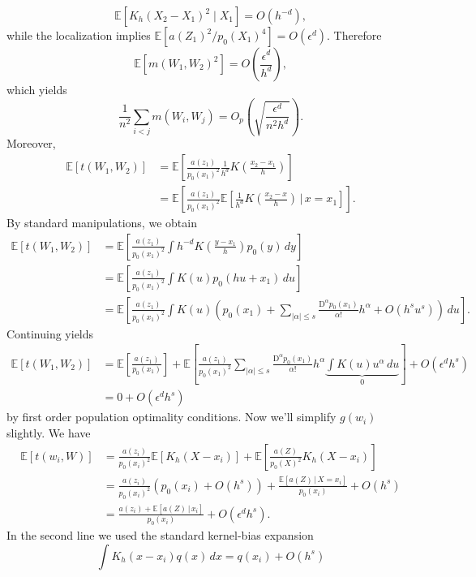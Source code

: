 \documentclass[11pt]{article}
\begin{document}
\[
\mathbb{E}[K_h(X_2-X_1)^2\mid X_1] = O(h^{-d}),
\]
while the localization implies $\mathbb{E}[a(Z_1)^2/p_0(X_1)^4] = O(\epsilon^d)$. Therefore
\[
\mathbb{E}[m(W_1,W_2)^2] = O\left(\frac{\epsilon^d}{h^d}\right),
\]
which yields
\[
\frac{1}{n^2}\sum_{i<j}m(W_i,W_j)
= O_p\left(\sqrt{\frac{\epsilon^d}{n^2h^d}}\right).
\]
Moreover,
\begin{align*}
    \mathbb{E}[t(W_1, W_2)] &= \mathbb{E}\left[\frac{a(z_1)}{p_0(x_1)^2}\frac{1}{h^d}K\left(\frac{x_2 - x_1}{h}\right)\right] \\
    &= \mathbb{E}\left[\frac{a(z_1)}{p_0(x_1)^2}\mathbb{E}\left[\frac{1}{h^d}K\left(\frac{x_2 - x}{h}\right)\,\Bigg|\, x = x_1\right]\right].
\end{align*}
By standard manipulations, we obtain 
\begin{align*}
    \mathbb{E}[t(W_1, W_2)] &= \mathbb{E}\left[\frac{a(z_1)}{p_0(x_1)^2}\int h^{-d}K\left(\frac{y - x_1}{h}\right)p_0(y) \,dy\right] \\
    &= \mathbb{E}\left[\frac{a(z_1)}{p_0(x_1)^2}\int K\left(u\right)p_0(hu + x_1) \,du\right] \tag{$u = (y-x_1)/h$} \\
    &= \mathbb{E}\left[\frac{a(z_1)}{p_0(x_1)^2}\int K\left(u\right)\left(p_0(x_1) + \sum_{|\alpha| \leq s}\frac{\text{D}^\alpha p_0(x_1)}{\alpha!}h^\alpha + O(h^su^s)\right) \,du\right].
\end{align*}
Continuing yields
\begin{align*}
    \mathbb{E}[t(W_1, W_2)] &= \mathbb{E}\left[\frac{a(z_1)}{p_0(x_1)}\right] + \mathbb{E}\left[\frac{a(z_1)}{p_0(x_1)^2}\sum_{|\alpha| \leq s}\frac{\text{D}^\alpha p_0(x_1)}{\alpha!}h^\alpha \underbrace{\int K\left(u\right) u^\alpha \,du}_{0}\right]  + O(\epsilon ^dh^s) \\
    &= 0 + O(\epsilon^d h^s)
\end{align*}
by first order population optimality conditions. Now we'll simplify $g(w_i)$ slightly. We have
\begin{align*}
    \mathbb{E}[t(w_i, W)] &=  
    \frac{a(z_i)}{p_0(x_i)^2}\mathbb{E}\left[K_h(X - x_i)\right] + \mathbb{E}\left[\frac{a(Z)}{p_0(X)^2}K_h(X - x_i)\right] \\
    &= \frac{a(z_i)}{p_0(x_i)^2}\left(p_0(x_i) + O(h^s)\right) + \frac{\mathbb{E}[a(Z)\, | \, X = x_i]}{p_0(x_i)} + O(h^s)\\
    &= \frac{a(z_i) + \mathbb{E}[a(Z)\,| \,x_i]}{p_0(x_i)} + O(\epsilon^dh^s). 
\end{align*}
In the second line we used the standard kernel-bias expansion
\[
\int K_h(x-x_i)q(x)\,dx = q(x_i)+O(h^s)
\]
\end{document}
